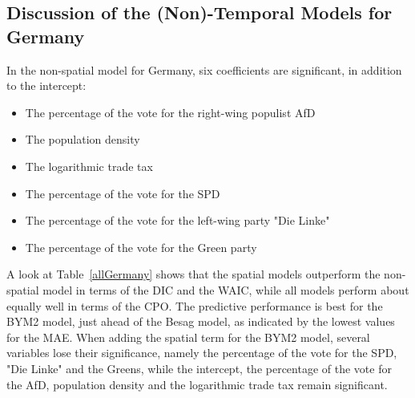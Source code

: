 \subsection{Discussion of the (Non)-Temporal Models for Germany}
In the non-spatial model for Germany, six coefficients are significant, in addition to the intercept:
\begin{itemize}
    \item The percentage of the vote for the right-wing populist AfD
    \item The population density
    \item The logarithmic trade tax
    \item The percentage of the vote for the SPD
    \item The percentage of the vote for the left-wing party "Die Linke"
    \item The percentage of the vote for the Green party
\end{itemize}
A look at Table~\ref{allGermany} shows that the spatial models outperform the non-spatial model in terms of the DIC and the WAIC, while all models perform about equally well in terms of the CPO. The predictive performance is best for the BYM2 model, just ahead of the Besag model, as indicated by the lowest values for the MAE. When adding the spatial term for the BYM2 model, several variables lose their significance, namely the percentage of the vote for the SPD, "Die Linke" and the Greens, while the intercept, the percentage of the vote for the AfD, population density and the logarithmic trade tax remain significant. \\
